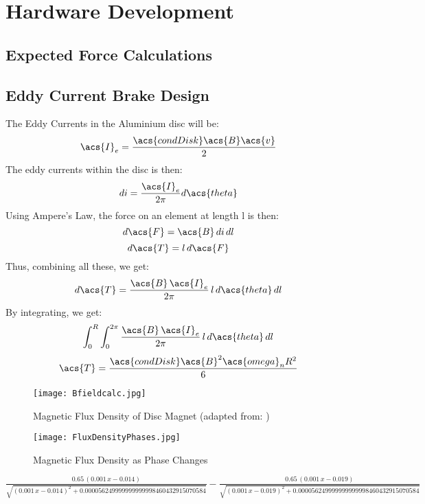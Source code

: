 
\chapter{Hardware Development}

\section{Expected Force Calculations}

\newpage
\section{Eddy Current Brake Design}

The Eddy Currents in the Aluminium disc will be:
\[
	\acs{I}_e = \frac{\acs{condDisk} \acs{B} \acs{v}}{2}
\]
The eddy currents within the disc is then:
\[
	di = \frac{\acs{I}_e}{2 \pi} d\acs{theta}
\]
Using Ampere's Law, the force on an element at length l is then:
\[
	d\acs{F} = \acs{B} \, di \, dl
\]
\[
	d\acs{T} = l \, d\acs{F}
\]
Thus, combining all these, we get:
\[
	d\acs{T} = \frac{\acs{B} \, \acs{I}_e}{2 \pi} \, l \, d\acs{theta} \, dl
\]
By integrating, we get:
\[
	\int_{0}^{R} \int_{0}^{2 \pi} \frac{\acs{B} \, \acs{I}_e}{2 \pi} \, l \, d\acs{theta} \, dl
\]
\[
	\acs{T} = \frac{\acs{condDisk}\acs{B}^2\acs{omega}_n R^2}{6}
\]

\begin{figure}[H]
	\begin{center}
		\texttt{[image: Bfieldcalc.jpg]}
		\caption{Magnetic Flux Density of Disc Magnet (adapted from: \citep{Supermagnete:2010})}
		\label{fig:B0}
	\end{center}
\end{figure}

\begin{figure}[H]
	\begin{center}
		\texttt{[image: FluxDensityPhases.jpg]}
		\caption{Magnetic Flux Density as Phase Changes}
		\label{fig:fluxD0}
	\end{center}
\end{figure}


$\frac{0.65\,{\left(0.001\,x-0.014\right)}}{\sqrt{{{\left(0.001\,x-0.014\right)}}^2 +0.000056249999999999998460432915070584}}-\frac{0.65\,{\left(0.001\,x-0.019\right)}}{\sqrt{{{\left(0.001\,x-0.019\right)}}^2 +0.000056249999999999998460432915070584}}$